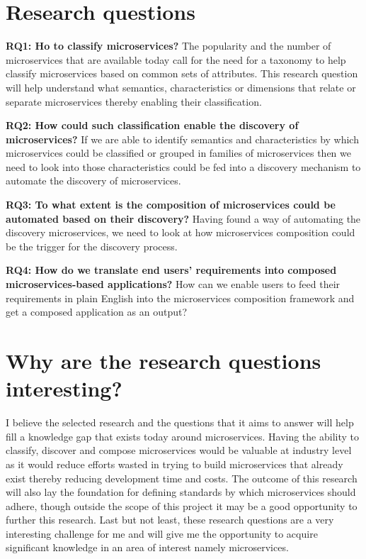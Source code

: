 \documentclass{article}
\begin{document}
\section{Research questions}

\textbf{RQ1: Ho to classify microservices?}
The popularity and the number of microservices that are available today call for the need for a taxonomy to help classify microservices based on common sets of attributes. This research question will help understand what semantics, characteristics or dimensions that relate or separate microservices thereby enabling their classification.

\textbf{RQ2: How could such classification enable the discovery of microservices?}
If we are able to identify semantics and characteristics by which microservices could be classified or grouped in families of microservices then we need to look into those characteristics could be fed into a discovery mechanism to automate the discovery of microservices.

\textbf{RQ3: To what extent is the composition of microservices could be automated based on their discovery?}
Having found a way of automating the discovery microservices, we need to look at how microservices composition could be the trigger for the discovery process.

\textbf{RQ4: How do we translate end users’ requirements into composed microservices-based applications?}
How can we enable users to feed their requirements in plain English into the microservices composition framework and get a composed application as an output? 

\section{Why are the research questions interesting?}

I believe the selected research and the questions that it aims to answer will help fill a knowledge gap that exists today around microservices. Having the ability to classify, discover and compose microservices would be valuable at industry level as it would reduce efforts wasted in trying to build microservices that already exist thereby reducing development time and costs. The outcome of this research will also lay the foundation for defining standards by which microservices should adhere, though outside the scope of this project it may be a good opportunity to further this research. Last but not least, these research questions are a very interesting challenge for me and will give me the opportunity to acquire significant knowledge in an area of interest namely microservices.
\end{document}
